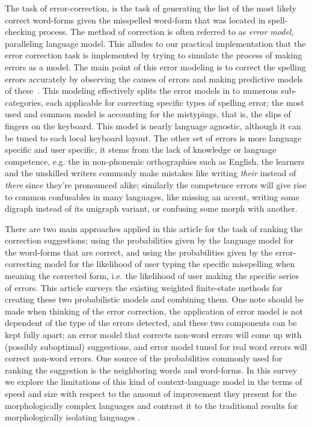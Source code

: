 \documentclass[a4paper,12pt]{article}
\begin{document}
The task of error-correction, is the task of generating the list of the most
likely correct word-forms given the misspelled word-form that was located in
spell-checking process. The method of correction is often referred to as
\emph{error model}, paralleling language model. This alludes to our practical
implementation that the error correction task is implemented by trying to
simulate the process of making errors as a model. The main point of this error
modeling is to correct the spelling errors accurately by observing the causes
of errors and making predictive models of
these~\cite[]{deorowicz2005correcting}.  This modeling effectively splits the
error models in to numerous sub-categories, each applicable for correcting
specific types of spelling error; the most used and common model is accounting
for the mistypings, that is, the slips of fingers on the keyboard. This model
is nearly language agnostic, although it can be tuned to each local keyboard
layout. The other set of errors is more language specific and user specific, it
stems from the lack of knowledge or language competence, e.g.  the in
non-phonemic orthographies such as English, the learners and the unskilled
writers commonly make mistakes like writing \emph{their} instead of
\emph{there} since they're pronounced alike; similarly the competence errors
will give rise to common confusables in many languages, like missing an accent,
writing some digraph instead of its unigraph variant, or confusing some morph
with another.

There are two main approaches applied in this article for the task of ranking
the correction suggestions; using the probabilities given by the language model
for the word-forms that are correct, and using the probabilities given by the
error-correcting model for the likelihood of user typing the specific
misspelling when meaning the corrected form, i.e. the likelihood of user making
the specific series of errors. This article surveys the existing weighted
finite-state methods for creating these two probabilistic models and combining
them. One note should be made when thinking of the error correction, the
application of error model is not dependent of the type of the errors detected,
and these two components can be kept fully apart; an error model that corrects
non-word errors will come up with (possibly suboptimal) suggestions, and error
model tuned for real word errors will correct non-word errors.  One source of
the probabilities commonly used \cite[]{pirinen2012improving,otero/2007} for
ranking the suggestion is the neighboring words and word-forms. In this survey
we explore the limitations of this kind of context-language model in the terms
of speed and size with respect to the amount of improvement they present for
the morphologically complex languages and contrast it to the traditional
results for morphologically isolating languages
\cite[]{mays/1991,wilcoxohearn2008realword}.
\end{document}
